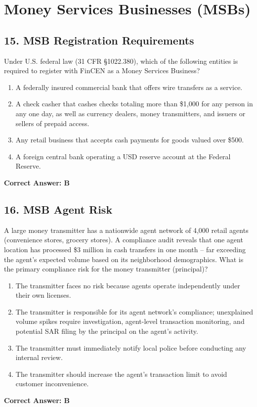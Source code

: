 \documentclass[11pt,a4paper]{article}
\begin{document}
	\section{Money Services Businesses (MSBs)}
	
	\subsection{15. MSB Registration Requirements}
	Under U.S. federal law (31 CFR \S 1022.380), which of the following entities is required to register with FinCEN as a Money Services Business?
	\begin{enumerate}[label=\Alph*.]
		\item A federally insured commercial bank that offers wire transfers as a service.
		\item A check casher that cashes checks totaling more than \$1,000 for any person in any one day, as well as currency dealers, money transmitters, and issuers or sellers of prepaid access.
		\item Any retail business that accepts cash payments for goods valued over \$500.
		\item A foreign central bank operating a USD reserve account at the Federal Reserve.
	\end{enumerate}
	\textbf{Correct Answer: B}
	
	\subsection{16. MSB Agent Risk}
	A large money transmitter has a nationwide agent network of 4,000 retail agents (convenience stores, grocery stores). A compliance audit reveals that one agent location has processed \$3 million in cash transfers in one month -- far exceeding the agent's expected volume based on its neighborhood demographics. What is the primary compliance risk for the money transmitter (principal)?
	\begin{enumerate}[label=\Alph*.]
		\item The transmitter faces no risk because agents operate independently under their own licenses.
		\item The transmitter is responsible for its agent network's compliance; unexplained volume spikes require investigation, agent-level transaction monitoring, and potential SAR filing by the principal on the agent's activity.
		\item The transmitter must immediately notify local police before conducting any internal review.
		\item The transmitter should increase the agent's transaction limit to avoid customer inconvenience.
	\end{enumerate}
	\textbf{Correct Answer: B}
	
\end{document}

